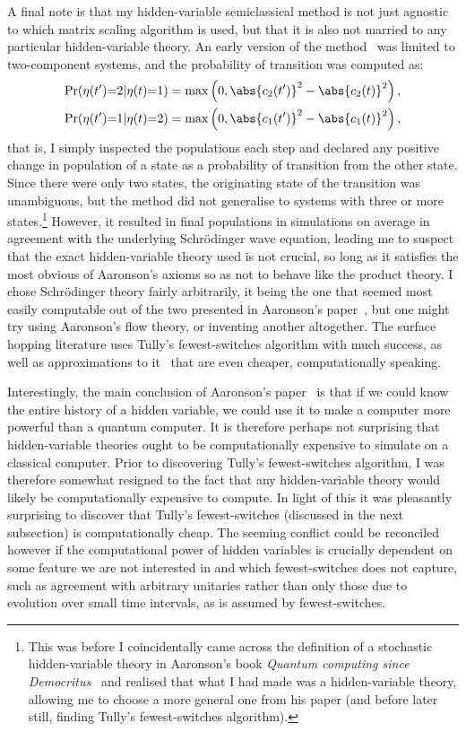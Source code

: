 A final note is that my hidden-variable semiclassical method is not just agnostic to which matrix scaling algorithm is used, but that it is also not married to any particular hidden-variable theory. An early version of the method~\cite{billington_monte_2015} was limited to two-component systems, and the probability of transition was computed as:
\begin{align} 
\Pr(\eta(t^\prime){=}2|\eta(t){=}1) &=
\max\left(0, \abs{c_2(t^\prime)}^2 - \abs{c_2(t)}^2\right),\\
\Pr(\eta(t^\prime){=}1|\eta(t){=}2) &= 
\max\left(0, \abs{c_1(t^\prime)}^2 - \abs{c_1(t)}^2\right),
\end{align}
that is, I simply inspected the populations each step and declared any positive change in population of a state as a probability of transition from the other state. Since there were only two states, the originating state of the transition was unambiguous, but the method did not generalise to systems with three or more states.\footnote{This was before I coincidentally came across the definition of a stochastic hidden-variable theory in Aaronson's book \emph{Quantum computing since Democritus}~\cite{aaronson_quantum_2013} and realised that what I had made was a hidden-variable theory, allowing me to choose a more general one from his paper (and before later still, finding Tully's fewest-switches algorithm).} However, it resulted in final populations in simulations on average in agreement with the underlying Schr\"odinger wave equation, leading me to suspect that the exact hidden-variable theory used is not crucial, so long as it satisfies the most obvious of Aaronson's axioms so as not to behave like the product theory. I chose Schr\"odinger theory fairly arbitrarily, it being the one that seemed most easily computable out of the two presented in Aaronson's paper~\cite{PhysRevA.71.032325}, but one might try using Aaronson's flow theory, or inventing another altogether. The surface hopping literature uses Tully's fewest-switches algorithm with much success, as well as approximations to it~\cite{FABIANO2008111} that are even cheaper, computationally speaking.

Interestingly, the main conclusion of Aaronson's paper~\cite{PhysRevA.71.032325} is that if we could know the entire history of a hidden variable, we could use it to make a computer more powerful than a quantum computer. It is therefore perhaps not surprising that hidden-variable theories ought to be computationally expensive to simulate on a classical computer. Prior to discovering Tully's fewest-switches algorithm, I was therefore somewhat resigned to the fact that any hidden-variable theory would likely be computationally expensive to compute. In light of this it was pleasantly surprising to discover that Tully's fewest-switches (discussed in the next subsection) is computationally cheap. The seeming conflict could be reconciled however if the computational power of hidden variables is crucially dependent on some feature we are not interested in and which fewest-switches does not capture, such as agreement with arbitrary unitaries rather than only those due to evolution over small time intervals, as is assumed by fewest-switches.

